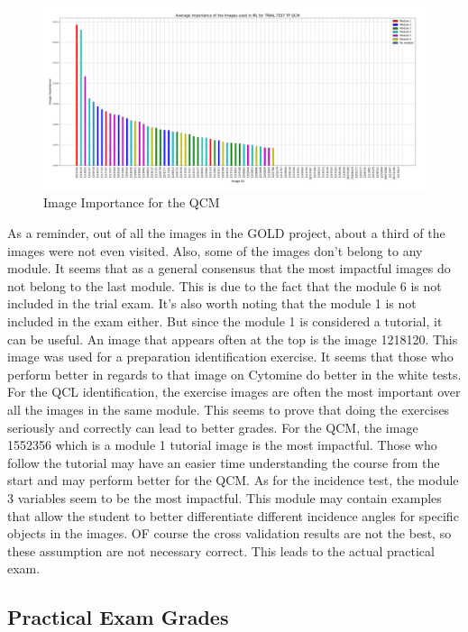 \documentclass[a4paper,11pt]{report}
\numberwithin{figure}{section} %
\begin{document}
      \begin{figure}[H]
      \centering
      \includegraphics[width=.95\linewidth]{plots/im_importance_TRIAL_TEST_TP_QCM_2018-04-29_14_34_19.png}
      \caption{Image Importance for the QCM}
      \label{fig:im_white3}
      \end{figure}

    As a reminder, out of all the images in the GOLD project, about a third of the images were not even visited.
    Also, some of the images don't belong to any module.
    It seems that as a general consensus that the most impactful images do not belong to the last module.
    This is due to the fact that the module 6 is not included in the trial exam.
    It's also worth noting that the module 1 is not included in the exam either.
    But since the module 1 is considered a tutorial, it can be useful.
    An image that appears often at the top is the image 1218120.
    This image was used for a preparation identification exercise.
    It seems that those who perform better in regards to that image on Cytomine do better in the white tests.
    For the QCL identification, the exercise images are often the most important over all the images in the same module.
    This seems to prove that doing the exercises seriously and correctly can lead to better grades.
    For the QCM, the image 1552356 which is a module 1 tutorial image is the most impactful.
    Those who follow the tutorial may have an easier time understanding the course from the start and may perform better for the QCM. As for the incidence test, the module 3 variables seem to be the most impactful.
    This module may contain examples that allow the student to better differentiate different incidence angles for specific objects in the images.
    OF course the cross validation results are not the best, so these assumption are not necessary correct. This leads to the actual practical exam.

    \subsection{Practical Exam Grades}
\end{document}

